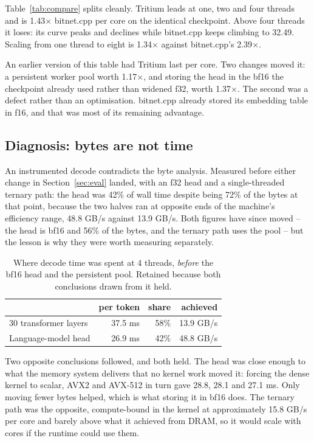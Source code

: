 \documentclass[10pt,twocolumn]{article}
\begin{document}
Table~\ref{tab:compare} splits cleanly. Tritium leads at one, two and four
threads and is 1.43$\times$ bitnet.cpp per core on the identical checkpoint.
Above four threads it loses: its curve peaks and declines while bitnet.cpp keeps
climbing to 32.49. Scaling from one thread to eight is 1.34$\times$ against
bitnet.cpp's 2.39$\times$.

An earlier version of this table had Tritium last per core. Two changes moved
it: a persistent worker pool worth 1.17$\times$, and storing the head in the
bf16 the checkpoint already used rather than widened f32, worth 1.37$\times$.
The second was a defect rather than an optimisation. bitnet.cpp already stored
its embedding table in f16, and that was most of its remaining advantage.

\subsection{Diagnosis: bytes are not time}

An instrumented decode contradicts the byte analysis. Measured before either
change in Section~\ref{sec:eval} landed, with an f32 head and a
single-threaded ternary path: the head was 42\% of wall time despite being
72\% of the bytes at that point, because the two halves ran at opposite ends of
the machine's efficiency range, 48.8 GB/s against 13.9 GB/s. Both figures have
since moved -- the head is bf16 and 56\% of the bytes, and the ternary path
uses the pool -- but the lesson is why they were worth measuring separately.

\begin{table}[t]
\centering
\small
\begin{tabular}{lrrr}
\toprule
 & per token & share & achieved \\
\midrule
30 transformer layers & 37.5 ms & 58\% & 13.9 GB/s \\
Language-model head   & 26.9 ms & 42\% & 48.8 GB/s \\
\bottomrule
\end{tabular}
\caption{Where decode time was spent at 4 threads, \emph{before} the bf16 head
and the persistent pool. Retained because both conclusions drawn from it held.}
\label{tab:time}
\end{table}

Two opposite conclusions followed, and both held. The head was close enough to
what the memory system delivers that no kernel work moved it: forcing the dense
kernel to scalar, AVX2 and AVX-512 in turn gave 28.8, 28.1 and 27.1 ms. Only
moving fewer bytes helped, which is what storing it in bf16 does. The ternary
path was the opposite, compute-bound in the kernel at approximately 15.8 GB/s
per core and barely above what it achieved from DRAM, so it would scale with
cores if the runtime could use them.
\end{document}
